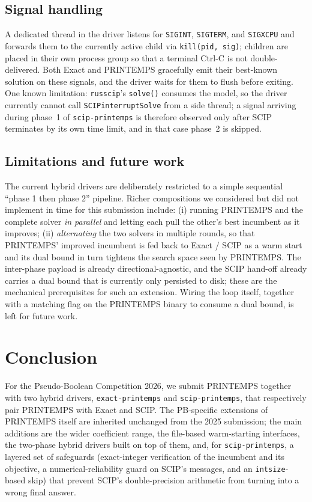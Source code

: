\documentclass[conference]{IEEEtran}
\begin{document}
\subsection{Signal handling}
A dedicated thread in the driver listens for \texttt{SIGINT}, \texttt{SIGTERM}, and \texttt{SIGXCPU} and forwards them to the currently active child via \texttt{kill(pid, sig)}; children are placed in their own process group so that a terminal Ctrl-C is not double-delivered. Both Exact and PRINTEMPS gracefully emit their best-known solution on these signals, and the driver waits for them to flush before exiting. One known limitation: \texttt{russcip}'s \texttt{solve()} consumes the model, so the driver currently cannot call \texttt{SCIPinterruptSolve} from a side thread; a signal arriving during phase~1 of \texttt{scip-printemps} is therefore observed only after SCIP terminates by its own time limit, and in that case phase~2 is skipped.

\subsection{Limitations and future work}
The current hybrid drivers are deliberately restricted to a simple sequential ``phase 1 then phase 2'' pipeline. Richer compositions we considered but did not implement in time for this submission include: (i) running PRINTEMPS and the complete solver \emph{in parallel} and letting each pull the other's best incumbent as it improves; (ii) \emph{alternating} the two solvers in multiple rounds, so that PRINTEMPS' improved incumbent is fed back to Exact / SCIP as a warm start and its dual bound in turn tightens the search space seen by PRINTEMPS. The inter-phase payload is already directional-agnostic, and the SCIP hand-off already carries a dual bound that is currently only persisted to disk; these are the mechanical prerequisites for such an extension. Wiring the loop itself, together with a matching flag on the PRINTEMPS binary to consume a dual bound, is left for future work.

\section{Conclusion}
For the Pseudo-Boolean Competition 2026, we submit PRINTEMPS together with two hybrid drivers, \texttt{exact-printemps} and \texttt{scip-printemps}, that respectively pair PRINTEMPS with Exact and SCIP. The PB-specific extensions of PRINTEMPS itself are inherited unchanged from the 2025 submission; the main additions are the wider coefficient range, the file-based warm-starting interfaces, the two-phase hybrid drivers built on top of them, and, for \texttt{scip-printemps}, a layered set of safeguards (exact-integer verification of the incumbent and its objective, a numerical-reliability guard on SCIP's messages, and an \texttt{intsize}-based skip) that prevent SCIP's double-precision arithmetic from turning into a wrong final answer.
\end{document}
